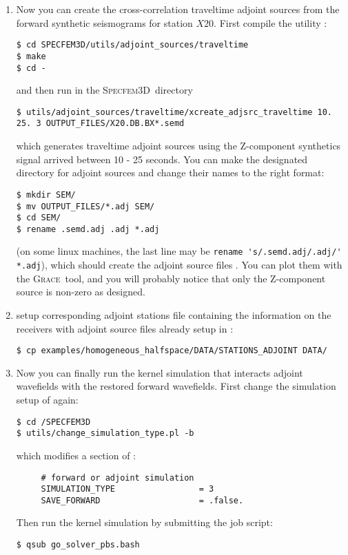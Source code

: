 \documentclass[10pt,fleqn,letterpaper]{article}
\newcommand{\specfem}{\textsc{Specfem3D}}
\newcommand{\grace}{\textsc{Grace}}
\begin{document}
\begin{enumerate}
\item Now you can create the cross-correlation traveltime adjoint sources from the forward synthetic seismograms for station $X20$. First compile the utility :
\begin{lstlisting}
$ cd SPECFEM3D/utils/adjoint_sources/traveltime
$ make
$ cd -
\end{lstlisting}
and then run in the \specfem\ directory
\begin{lstlisting}
$ utils/adjoint_sources/traveltime/xcreate_adjsrc_traveltime 10. 25. 3 OUTPUT_FILES/X20.DB.BX*.semd
\end{lstlisting}
which generates traveltime adjoint sources  using the Z-component synthetics signal arrived between 10 - 25 seconds. You can make the designated directory for adjoint sources and change their names to the right format:
\begin{lstlisting}
$ mkdir SEM/
$ mv OUTPUT_FILES/*.adj SEM/
$ cd SEM/
$ rename .semd.adj .adj *.adj
\end{lstlisting}
(on some linux machines, the last line may be \verb+rename 's/.semd.adj/.adj/' *.adj+), which  should create the adjoint source files . You can plot them with the \grace\ tool, and you will probably notice that only the Z-component source is non-zero as designed.

\item setup corresponding adjoint stations file  containing the information on the receivers with adjoint source files already setup in :
\begin{lstlisting}
$ cp examples/homogeneous_halfspace/DATA/STATIONS_ADJOINT DATA/
\end{lstlisting}

\item Now you can finally run the kernel simulation that interacts adjoint wavefields with the restored forward wavefields. First change the simulation setup of  again:
\begin{lstlisting}
$ cd /SPECFEM3D
$ utils/change_simulation_type.pl -b
\end{lstlisting}
which modifies a section of :
\begin{lstlisting}
     # forward or adjoint simulation
     SIMULATION_TYPE                 = 3
     SAVE_FORWARD                    = .false.
\end{lstlisting}
Then run the kernel simulation by submitting the job script:
\begin{lstlisting}
$ qsub go_solver_pbs.bash
\end{lstlisting}


\end{enumerate}
\end{document}
